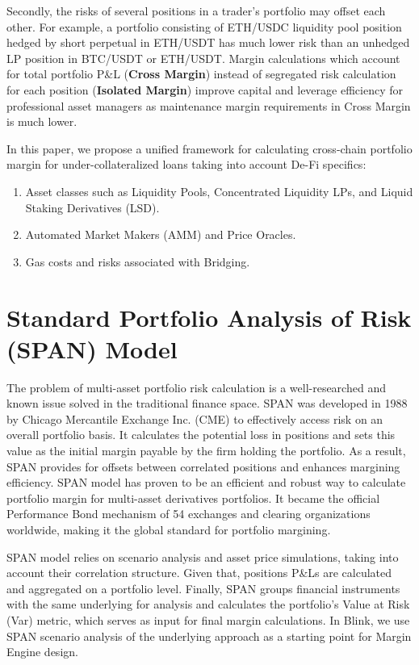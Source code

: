\documentclass[letterpaper, 12pt]{article}
\begin{document}
Secondly, the risks of several positions in a trader's portfolio may offset each other. For example, a portfolio consisting of ETH/USDC liquidity pool position hedged by short perpetual in ETH/USDT has much lower risk than an unhedged LP position in BTC/USDT or ETH/USDT. Margin calculations which account for total portfolio P\&L (\textbf {Cross Margin}) instead of segregated risk calculation for each position (\textbf {Isolated Margin}) improve capital and leverage efficiency for professional asset managers as maintenance margin requirements in Cross Margin is much lower. 

In this paper, we propose a unified framework for calculating cross-chain portfolio margin for under-collateralized loans taking into account De-Fi specifics:
  
  \begin{enumerate}
  \item Asset classes such as Liquidity Pools, Concentrated Liquidity LPs, and Liquid Staking Derivatives (LSD).
  \item Automated Market Makers (AMM) and Price Oracles.
  \item Gas costs and risks associated with Bridging.
  \end{enumerate}

 	


\section{Standard Portfolio Analysis of Risk (SPAN) Model}

The problem of multi-asset portfolio risk calculation is a well-researched and known issue solved in the traditional finance space. SPAN was developed in 1988 by Chicago Mercantile Exchange Inc. (CME) to effectively access risk on an overall portfolio basis. It calculates the potential loss in positions and sets this value as the initial margin payable by the firm holding the portfolio. As a result, SPAN provides for offsets between correlated positions and enhances margining efficiency. SPAN model has proven to be an efficient and robust way to calculate portfolio margin for multi-asset derivatives portfolios. It became the official Performance Bond mechanism of 54 exchanges and clearing organizations worldwide, making it the global standard for portfolio margining. 

SPAN model relies on scenario analysis and asset price simulations, taking into account their correlation structure. Given that, positions P\&Ls are calculated and aggregated on a portfolio level. Finally, SPAN groups financial instruments with the same underlying for analysis and calculates the portfolio's Value at Risk (Var) metric, which serves as input for final margin calculations. In Blink, we use SPAN scenario analysis of the underlying approach as a starting point for Margin Engine design.   
\end{document}

